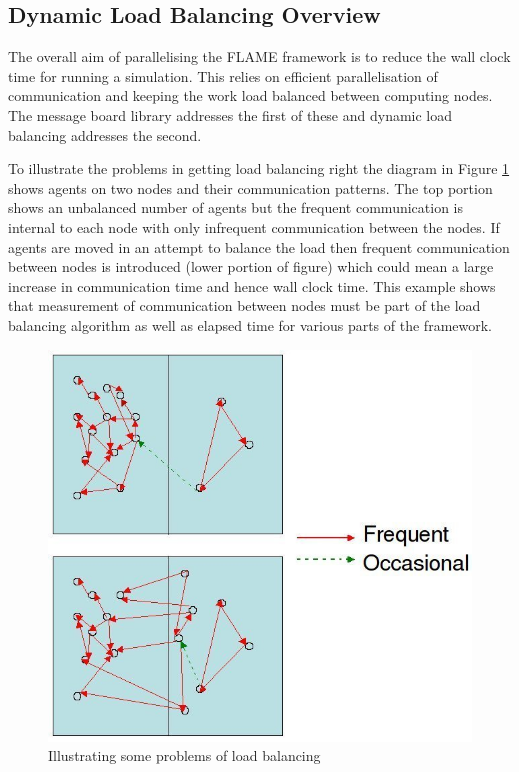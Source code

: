 \subsection{Dynamic Load Balancing Overview}

The overall aim of parallelising the FLAME framework is to reduce the wall clock time for running a simulation. This relies on efficient parallelisation of communication and keeping the work load balanced between computing nodes. The message board library addresses the first of these and dynamic load balancing addresses the second.

To illustrate the problems in getting load balancing right the diagram in Figure \ref{fig:load_balance_problem} shows agents on two nodes and their communication patterns. The top portion shows an unbalanced number of agents but the frequent communication is internal to each node with only infrequent communication between the nodes. If agents are moved in an attempt to balance the load then frequent communication between nodes is introduced (lower portion of figure) which could mean a large increase in communication time and hence wall clock time. This example shows that measurement of communication between nodes must be part of the load balancing algorithm as well as elapsed time for various parts of the framework.

\begin{figure}[h]
 \centering
  \includegraphics[scale=0.50]{load_balance.jpg}
 \caption{Illustrating some problems of load balancing}
 \label{fig:load_balance_problem}
\end{figure}

